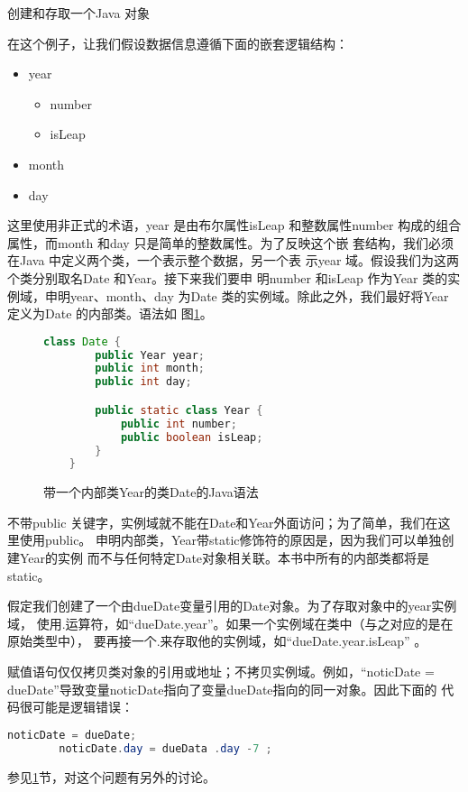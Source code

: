 \begin{example}\label{Example:CreateAndAccessAClass}
创建和存取一个Java 对象

在这个例子，让我们假设数据信息遵循下面的嵌套逻辑结构：
\begin{itemize}
    \item year
    \begin{itemize}
        \item number
        \item isLeap
    \end{itemize}
    \item month
    \item day
\end{itemize}

这里使用非正式的术语，year 是由布尔属性isLeap 和整数属性number
构成的组合属性，而month 和day 只是简单的整数属性。为了反映这个嵌
套结构，我们必须在Java 中定义两个类，一个表示整个数据，另一个表
示year 域。假设我们为这两个类分别取名Date 和Year。接下来我们要申
明number 和isLeap 作为Year 类的实例域，申明year、month、day 为Date
类的实例域。除此之外，我们最好将Year 定义为Date 的内部类。语法如
图\ref{Fig:DataClasswithYear}。

\begin{figure}
\begin{lstlisting}[language={Java}, keywordstyle=\color{blue!70}, commentstyle=\color{red!50!green!50!blue!50}]
    class Date {
        public Year year;
        public int month;
        public int day;

        public static class Year {
            public int number;
            public boolean isLeap;
        }
    }
\end{lstlisting}
\caption{带一个内部类Year的类Date的Java语法}\label{Fig:DataClasswithYear}
\end{figure}

不带public 关键字，实例域就不能在Date和Year外面访问；为了简单，我们在这里使用public。
申明内部类，Year带static修饰符的原因是，因为我们可以单独创建Year的实例
而不与任何特定Date对象相关联。本书中所有的内部类都将是static。

假定我们创建了一个由dueDate变量引用的Date对象。为了存取对象中的year实例域，
使用.运算符，如“dueDate.year”。如果一个实例域在类中（与之对应的是在原始类型中），
要再接一个.来存取他的实例域，如“dueDate.year.isLeap” 。

赋值语句仅仅拷贝类对象的引用或地址；不拷贝实例域。例如，“noticDate =
dueDate”导致变量noticDate指向了变量dueDate指向的同一对象。因此下面的
代码很可能是逻辑错误：
\begin{lstlisting}[language={Java}, keywordstyle=\color{blue!70}, commentstyle=\color{red!50!green!50!blue!50}]
    noticDate = dueDate;
        noticDate.day = dueData .day -7 ;
\end{lstlisting}
\noindent
参见\ref{Fig:DataClasswithYear}节，对这个问题有另外的讨论。
\end{example}

